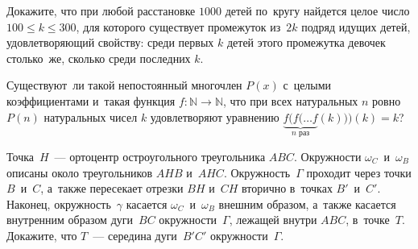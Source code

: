 


\begin{problems}

\item
Докажите, что при любой расстановке $1000$ детей по~кругу найдется целое число
$100 \leq k \leq 300$, для которого существует промежуток из~$2k$ подряд идущих
детей, удовлетворяющий свойству: среди первых $k$ детей этого промежутка
девочек столько~же, сколько среди последних $k$.

\item
Существуют~ли такой непостоянный многочлен $P(x)$ с~целыми коэффициентами
и~такая функция $f \colon \mathbb{N} \to \mathbb{N}$, что при всех натуральных
$n$ ровно $P(n)$ натуральных чисел $k$ удовлетворяют уравнению
$\underbrace{f (f (\ldots f}_{\text{$n$ раз}}(k))) (k) = k$?

\item
Точка~$H$~--- ортоцентр остроугольного треугольника $ABC$.
Окружности $\omega_C$~и~$\omega_B$ описаны около треугольников $AHB$ и~$AHC$.
Окружность~$\Gamma$ проходит через точки $B$~и~$C$, а~также пересекает отрезки
$BH$ и~$CH$ вторично в~точках $B'$~и~$C'$.
Наконец, окружность~$\gamma$ касается $\omega_C$~и~$\omega_B$ внешним образом,
а~также касается внутренним образом дуги~$BC$ окружности~$\Gamma$, лежащей
внутри $ABC$, в~точке~$T$.
Докажите, что $T$~--- середина дуги~$B'C'$ окружности~$\Gamma$.

\end{problems}

